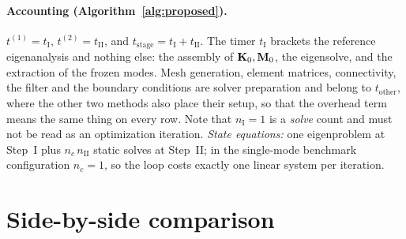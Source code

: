 \paragraph{Accounting (Algorithm~\ref{alg:proposed}).}
$t^{(1)} = t_{\mathrm{I}}$, $t^{(2)} = t_{\mathrm{II}}$, and
$t_{\mathrm{stage}} = t_{\mathrm{I}} + t_{\mathrm{II}}$.  The timer
$t_{\mathrm{I}}$ brackets the reference eigenanalysis and nothing else:
the assembly of $\mathbf{K}_0,\mathbf{M}_0$, the eigensolve, and the extraction of the
frozen modes.  Mesh generation, element matrices, connectivity, the filter
and the boundary conditions are solver preparation and belong to
$t_{\mathrm{other}}$, where the other two methods also place their setup, so
that the overhead term means the same thing on every row.  Note that
$n_{\mathrm{I}} = 1$ is a \emph{solve} count and must not be read as an
optimization iteration.  \emph{State equations:} one eigenproblem at Step~I
plus $n_c\,n_{\mathrm{II}}$ static solves at Step~II; in the single-mode
benchmark configuration $n_c = 1$, so the loop costs exactly one linear
system per iteration.

\section{Side-by-side comparison}

